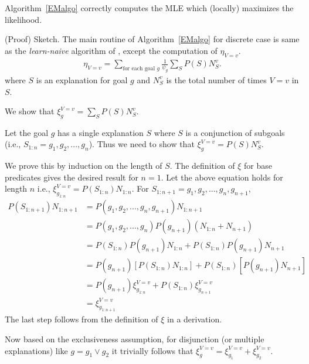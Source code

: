 \begin{Thm}
Algorithm~\ref{EMalgo} correctly computes the MLE which (locally) maximizes the likelihood.
\end{Thm}

\noindent (Proof) Sketch. The main routine of Algorithm~\ref{EMalgo}
for discrete case is same as the \emph{learn-naive} algorithm of , except the computation of $\eta_{V=v}$. 
\begin{align*}
\eta_{V=v} = \sum_{\text{for each goal } g} \frac{1} {\psi_{g}} \sum_{S} P(S)N^{v}_{S}.
\end{align*}
where $S$ is an explanation for goal $g$ and $N^{v}_{S}$ is the total number of times $V=v$ in $S$. 

We show that $\xi^{V=v}_{g} = \sum_{S} P(S)N^{v}_{S}$.

Let the goal $g$ has a single explanation $S$ where $S$ is a conjunction of subgoals (i.e., $S_{1:n} = g_{1}, g_{2}, ...,g_{n}$). Thus we need to show that $\xi^{V=v}_{g} = P(S)N^{v}_{S}$. 

We prove this by induction on the length of $S$. The definition of $\xi$ for base predicates gives the desired result for $n=1$. Let the above equation holds for length $n$ i.e., $\xi^{V=v}_{g_{1:n}} = P(S_{1:n})N_{1:n}$. For $S_{1:n+1} = g_{1}, g_{2}, ..., g_{n}, g_{n+1}$,
\begin{align*}
P(S_{1:n+1})N_{1:n+1} &= P(g_{1}, g_{2}, ..., g_{n}, g_{n+1})N_{1:n+1}\\
 &= \scriptstyle P(g_{1}, g_{2}, ..., g_{n}) P(g_{n+1}) (N_{1:n}+N_{n+1})\\
&= \scriptstyle P(S_{1:n}) P(g_{n+1}) N_{1:n} + P(S_{1:n}) P(g_{n+1}) N_{n+1}\\
&= \scriptstyle P(g_{n+1}) [P(S_{1:n})N_{1:n}] + P(S_{1:n}) [P(g_{n+1}) N_{n+1}]\\
&= P(g_{n+1}) \xi^{V=v}_{g_{1:n}}  + P(S_{1:n}) \xi^{V=v}_{g_{n+1}}\\
&= \xi^{V=v}_{g_{1:n+1}}
\end{align*}
The last step follows from the definition of $\xi$ in a derivation. 

Now based on the exclusiveness assumption, for disjunction (or multiple explanations) like $g = g_{1} \vee g_{2}$ it trivially follows that $\xi^{V=v}_{g} = \xi^{V=v}_{g_{1}} + \xi^{V=v}_{g_{2}}$.


